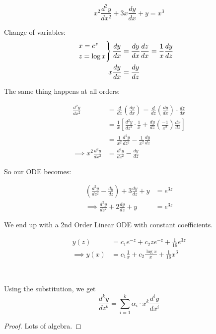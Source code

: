 \documentclass[twoside]{scrartcl}
\begin{document}
\begin{example}
\[x^2\frac{d^2y}{dx^2} + 3x\frac{dy}{dx} + y = x^3\]

Change of variables: 
\[\begin{aligned}
\begin{rcases*}
x = e^z\\
z = \log x	
\end{rcases*}
\frac{dy}{dx} &= \frac{dy}{dx}\frac{dz}{dx} = \frac{1}{x}\frac{dy}{dz}\\
x\frac{dy}{dx} &= \frac{dy}{dz}
\end{aligned}\]

The same thing happens at all orders: 

\[
\begin{aligned}
  \frac{d^2y}{dx^2} &= \frac{d}{dx}\left(\frac{dy}{dx}\right) = \frac{d}{dz}\left(\frac{dy}{dx}\right)\cdot\frac{dz}{dx}\\
  &= \frac{1}{x}\left[\frac{d^2y}{dz^2}\cdot\frac{1}{x} + \frac{dy}{dz}\left(\frac{-1}{x^2}\right)\frac{dx}{dz}\right]\\
  &= \frac{1}{x^2}\frac{d^2y}{dz^2} - \frac{1}{x^2}\frac{dy}{dz}\\
  \implies x^2\frac{d^2y}{dx^2} &= \frac{d^2y}{dz^2} - \frac{dy}{dz}
\end{aligned}
\]

So our ODE becomes:

\[
\begin{aligned}
  \left(\frac{d^2y}{dz^2} - \frac{dy}{dz}\right) + 3\frac{dy}{dz} + y &= e^{3z}\\
 \implies \frac{d^2y}{dz^2} + 2\frac{dy}{dz} + y &= e^{3z}
\end{aligned}
\]

We end up with a 2nd Order Linear ODE with constant coefficients. 

\[
\begin{aligned}
  y(z) &= c_1e^{-z} + c_2ze^{-z} + \frac{1}{16}e^{3z}\\
\implies  y(x) &= c_1\frac{1}{x} + c_2\frac{\log x}{x} + \frac{1}{16}x^3
\end{aligned}
\]
\end{example}~


\begin{theorem}
Using the substitution, we get
\[\frac{d^ky}{dz^k} = \sum_{i=1}^k\alpha_i\cdot x^k\frac{d^iy}{dx^i}\]	
\end{theorem}
\begin{proof}
Lots of algebra. 
\end{proof}
\end{document}
